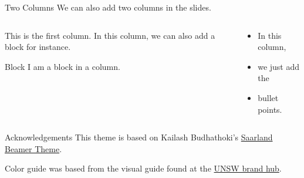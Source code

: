 \documentclass[aspectratio=169]{beamer}
\begin{document}
	\begin{frame}{Two Columns}
		We can also add two columns in the slides.
		\begin{columns}[t]
			\begin{column}[T]{0.4\textwidth}
				This is the first column. In this column, we can also add a block for instance.
				\vspace{1em}
				\begin{block}{Block}
					I am a block in a column.
				\end{block}
			\end{column}
			\begin{column}[T]{0.4\textwidth}
				\begin{itemize}
					\item In this column,
					\item we just add the
					\item bullet points.
				\end{itemize}
			\end{column}
		\end{columns}
	\end{frame}
	\begin{frame}{Acknowledgements}
		This theme is based on Kailash Budhathoki's \href{https://github.com/kailashbuki/beamerthemesaarland}{Saarland Beamer Theme}.
		
		Color guide was based from the visual guide found at the \href{https://www.brand.unsw.edu.au/download/}{UNSW brand hub}.
	\end{frame}
\end{document}
